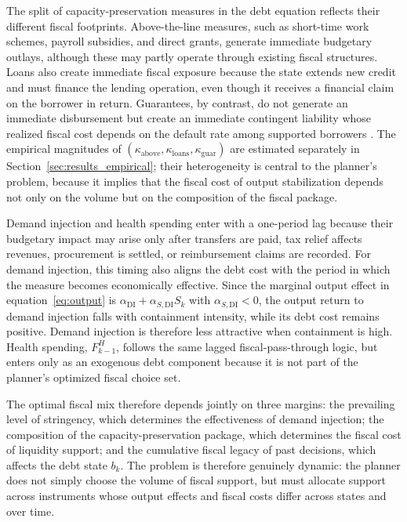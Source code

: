 \documentclass[12pt, a4paper]{article}
\begin{document}
The split of capacity-preservation measures in the debt equation reflects their different fiscal footprints. Above-the-line measures, such as short-time work schemes, payroll subsidies, and direct grants, generate immediate budgetary outlays, although these may partly operate through existing fiscal structures. Loans also create immediate fiscal exposure because the state extends new credit and must finance the lending operation, even though it receives a financial claim on the borrower in return. Guarantees, by contrast, do not generate an immediate disbursement but create an immediate contingent liability whose realized fiscal cost depends on the default rate among supported borrowers \citep{imf2022fiscalmonitor}. The empirical magnitudes of $(\kappa_{\text{above}}, \kappa_{\text{loans}}, \kappa_{\text{guar}})$ are estimated separately in Section~\ref{sec:results_empirical}; their heterogeneity is central to the planner's problem, because it implies that the fiscal cost of output stabilization depends not only on the volume but on the composition of the fiscal package.

Demand injection and health spending enter with a one-period lag because their budgetary impact may arise only after transfers are paid, tax relief affects revenues, procurement is settled, or reimbursement claims are recorded. For demand injection, this timing also aligns the debt cost with the period in which the measure becomes economically effective. Since the marginal output effect in equation~\eqref{eq:output} is $\alpha_{\text{DI}}+\alpha_{S,\text{DI}}S_k$ with $\alpha_{S,\text{DI}}<0$, the output return to demand injection falls with containment intensity, while its debt cost remains positive. Demand injection is therefore less attractive when containment is high. Health spending, $F^H_{k-1}$, follows the same lagged fiscal-pass-through logic, but enters only as an exogenous debt component because it is not part of the planner's optimized fiscal choice set.

The optimal fiscal mix therefore depends jointly on three margins: the prevailing level of stringency, which determines the effectiveness of demand injection; the composition of the capacity-preservation package, which determines the fiscal cost of liquidity support; and the cumulative fiscal legacy of past decisions, which affects the debt state $b_k$. The problem is therefore genuinely dynamic: the planner does not simply choose the volume of fiscal support, but must allocate support across instruments whose output effects and fiscal costs differ across states and over time.
\end{document}

